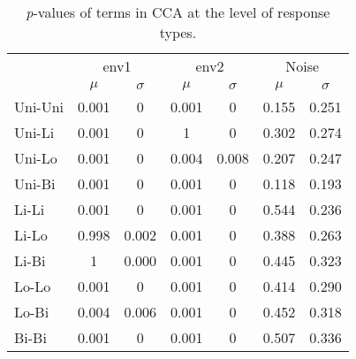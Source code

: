 		\begin{table*}[h!] 
				 
				\small
				\caption{\textit{p}-values of terms in CCA at the level of response types.}
				\centering
				
				\begin{tabular}{@{}lcccccc@{}}
					\toprule
					& \multicolumn{2}{c}{env1} & \multicolumn{2}{c}{env2} & \multicolumn{2}{c}{Noise}\\\cmidrule(l){2-3} \cmidrule(l){4-5} \cmidrule(l){6-7}
					& $\mu$ & $\sigma$ & $\mu$ & $\sigma$ & $\mu$ & $\sigma$\\
					\hline
					Uni-Uni& 0.001 & 0 & 0.001 & 0 & 0.155 & 0.251\\ 
					Uni-Li& 0.001 & 0 & 1 & 0 & 0.302 & 0.274\\ 
					Uni-Lo& 0.001 & 0 & 0.004 & 0.008 & 0.207 & 0.247\\ 
					Uni-Bi& 0.001 & 0 & 0.001 & 0 & 0.118 & 0.193\\ 
					Li-Li & 0.001 & 0 & 0.001 & 0 & 0.544 & 0.236\\ 
					Li-Lo & 0.998 & 0.002 & 0.001 & 0 & 0.388 & 0.263\\ 
					Li-Bi & 1 & 0.000 & 0.001 & 0 & 0.445 & 0.323\\ 
					Lo-Lo & 0.001 & 0 & 0.001 & 0 & 0.414 & 0.290\\ 
					Lo-Bi & 0.004 & 0.006 & 0.001 & 0 & 0.452 & 0.318\\ 
					Bi-Bi & 0.001 & 0 & 0.001 & 0 & 0.507 & 0.336 \\ 
					\toprule
				\end{tabular}
			
				\label{tab:ccasm2}
			
		\end{table*}
		
		\vspace{10em}
		
